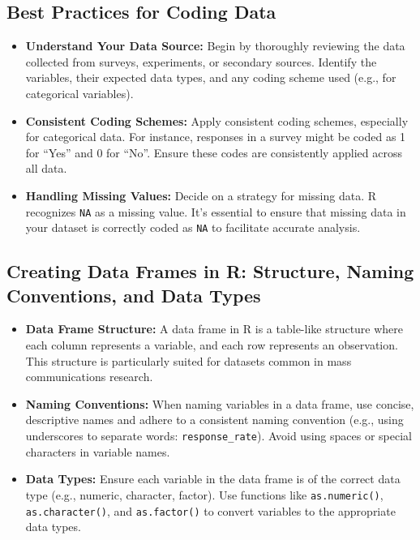 \documentclass[
]{book}
\begin{document}
\hypertarget{best-practices-for-coding-data}{%
\subsection*{Best Practices for Coding Data}\label{best-practices-for-coding-data}}

\begin{itemize}
\item
  \textbf{Understand Your Data Source:} Begin by thoroughly reviewing the data collected from surveys, experiments, or secondary sources. Identify the variables, their expected data types, and any coding scheme used (e.g., for categorical variables).
\item
  \textbf{Consistent Coding Schemes:} Apply consistent coding schemes, especially for categorical data. For instance, responses in a survey might be coded as 1 for ``Yes'' and 0 for ``No''. Ensure these codes are consistently applied across all data.
\item
  \textbf{Handling Missing Values:} Decide on a strategy for missing data. R recognizes \texttt{NA} as a missing value. It's essential to ensure that missing data in your dataset is correctly coded as \texttt{NA} to facilitate accurate analysis.
\end{itemize}

\hypertarget{creating-data-frames-in-r-structure-naming-conventions-and-data-types}{%
\subsection*{Creating Data Frames in R: Structure, Naming Conventions, and Data Types}\label{creating-data-frames-in-r-structure-naming-conventions-and-data-types}}

\begin{itemize}
\item
  \textbf{Data Frame Structure:} A data frame in R is a table-like structure where each column represents a variable, and each row represents an observation. This structure is particularly suited for datasets common in mass communications research.
\item
  \textbf{Naming Conventions:} When naming variables in a data frame, use concise, descriptive names and adhere to a consistent naming convention (e.g., using underscores to separate words: \texttt{response\_rate}). Avoid using spaces or special characters in variable names.
\item
  \textbf{Data Types:} Ensure each variable in the data frame is of the correct data type (e.g., numeric, character, factor). Use functions like \texttt{as.numeric()}, \texttt{as.character()}, and \texttt{as.factor()} to convert variables to the appropriate data types.
\end{itemize}
\end{document}
